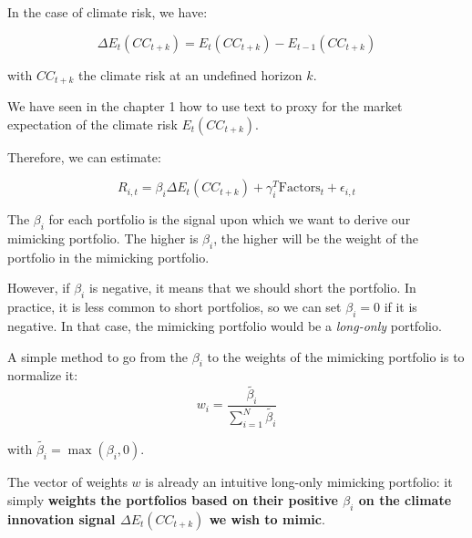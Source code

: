 In the case of climate risk, we have:

\begin{equation}
    \Delta E_t (CC_{t+k}) = E_t (CC_{t+k}) - E_{t-1} (CC_{t+k})
\end{equation}

with $CC_{t+k}$ the climate risk at an undefined horizon $k$.

We have seen in the chapter 1 how to use text to proxy for 
the market expectation of the climate risk $E_t(CC_{t+k})$.

Therefore, we can estimate:

\begin{equation}
    R_{i,t} = \beta_i \Delta E_t(CC_{t+k}) + \gamma_i^T \text{Factors}_t + \epsilon_{i,t}
\end{equation}

The $\beta_i$ for each portfolio is the signal 
upon which we want to derive our mimicking portfolio.
The higher is $\beta_i$, the higher will be the weight 
of the portfolio in the mimicking portfolio.

However, if $\beta_i$ is negative, it means that
we should short the portfolio. In practice, 
it is less common to short portfolios, so we
can set $\beta_i = 0$ if it is negative. In that 
case, the mimicking portfolio would be a \textit{long-only}
portfolio.

A simple method to go from the $\beta_i$ to the
weights of the mimicking portfolio is to normalize it:
\begin{equation}
    w_i = \frac{\tilde{\beta_i}}{\sum_{i=1}^{N} \tilde{\beta_i}}
\end{equation}

with $\tilde{\beta_i} = \max(\beta_i, 0)$.

The vector of weights $w$ is already an intuitive 
long-only mimicking portfolio: it simply 
\textbf{weights the portfolios based on their positive 
$\beta_i$ on the climate innovation signal 
$\Delta E_t(CC_{t+k})$ we wish to mimic}.
 